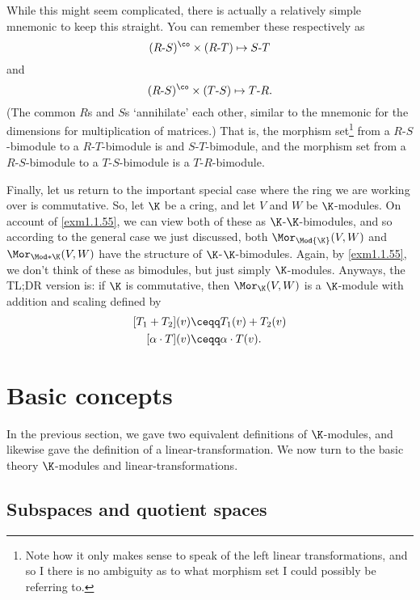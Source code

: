 While this might seem complicated, there is actually a relatively simple mnemonic to keep this straight.  You can remember these respectively as
\begin{equation}
(R\text{-}S)^{\co}\times (R\text{-}T)\mapsto S\text{-}T
\end{equation}
and
\begin{equation}
(R\text{-}S)^{\co}\times (T\text{-}S)\mapsto T\text{-}R.
\end{equation}
(The common $R$s and $S$s `annihilate' each other, similar to the mnemonic for the dimensions for multiplication of matrices.)  That is, the morphism set\footnote{Note how it only makes sense to speak of the left linear transformations, and so I there is no ambiguity as to what morphism set I could possibly be referring to.} from a $R$-$S$-bimodule to a $R$-$T$-bimodule is and $S$-$T$-bimodule, and the morphism set from a $R$-$S$-bimodule to a $T$-$S$-bimodule is a $T$-$R$-bimodule.

Finally, let us return to the important special case where the ring we are working over is commutative.  So, let $\K$ be a cring, and let $V$ and $W$ be $\K$-modules.  On account of \cref{exm1.1.55}, we can view both of these as $\K$-$\K$-bimodules, and so according to the general case we just discussed, both $\Mor _{\Mod{\K}}(V,W)$ and $\Mor _{\Mod*{\K}}(V,W)$ have the structure of $\K$-$\K$-bimodules.  Again, by \cref{exm1.1.55}, we don't think of these as bimodules, but just simply $\K$-modules.  Anyways, the TL;DR version is:  if $\K$ is commutative, then $\Mor _{\K}(V,W)$ is a $\K$-module with addition and scaling defined by
\begin{subequations}\label{eqn1.1.62}
	\begin{align}
		[T_1+T_2](v) & \ceqq T_1(v)+T_2(v) \\
		[\alpha \cdot T](v) & \ceqq \alpha \cdot T(v).
	\end{align}
\end{subequations}

\section{Basic concepts}

In the previous section, we gave two equivalent definitions of $\K$-modules, and likewise gave the definition of a linear-transformation.  We now turn to the basic theory $\K$-modules and linear-transformations.

\subsection{Subspaces and quotient spaces}

